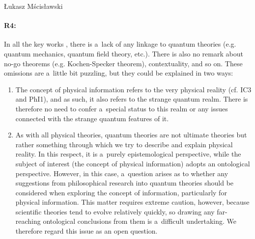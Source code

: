 \begin{artengenv}{Łukasz Mścisławski}
\paragraph{R4:} In all the key works
\parencites[i.e.,][]{krzanowski_what_2020}[][]{krzanowski_why_2020}[][]{krzanowski_ontological_2022}, %
 there is a~lack of any linkage to quantum theories (e.g. quantum mechanics, quantum field theory, etc.). There is also no remark about no-go theorems (e.g. Kochen-Specker theorem), contextuality, and so on. These omissions are a~little bit puzzling, but they could be explained in two ways:
\begin{enumerate}[label=(\arabic*)]
\item The concept of physical information refers to the very physical reality (cf. IC3 and PhI1), and as such, it also refers to the strange quantum realm. There is therefore no need to confer a~special status to this realm or any issues connected with the strange quantum features of it.

\item As with all physical theories, quantum theories are not ultimate theories but rather something through which we try to describe and explain physical reality. In this respect, it is a~purely epistemological perspective, while the subject of interest (the concept of physical information) adopts an ontological perspective. However, in this case, a~question arises as to whether any suggestions from philosophical research into quantum theories should be considered when exploring the concept of information, particularly for physical information. This matter requires extreme caution, however, because scientific theories tend to evolve relatively quickly, so drawing any far-reaching ontological conclusions from them is a~difficult undertaking. We therefore regard this issue as an open question.
\end{enumerate}

\end{artengenv}
